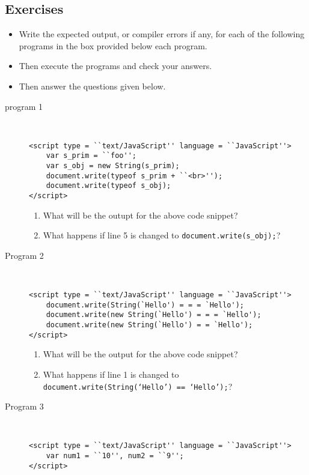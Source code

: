 \documentclass[11pt,a4paper]{article}
\def\AnswerBox{\fbox{\begin{minipage}{4in}\hfill\vspace{0.5in}\end{minipage}}}
\begin{document}
\subsection*{Exercises}
\begin{itemize}
\item Write the expected output, or compiler errors if any, for each of the following programs in the box provided below each program.
\item Then execute the programs and check your answers.
\item Then answer the questions given below.
\end{itemize}
\begin{description}
\item[program 1]\
\begin{lstlisting}
<script type = ``text/JavaScript'' language = ``JavaScript''>
    var s_prim = ``foo'';
    var s_obj = new String(s_prim);  
    document.write(typeof s_prim + ``<br>''); 
    document.write(typeof s_obj);  
</script>
\end{lstlisting}

\AnswerBox

\begin{enumerate}[label=\bfseries Q\arabic*:]\itemsep10pt
\item What will be the outupt for the above code snippet?
\item What happens if line 5 is changed to \texttt{document.write(s\_obj);}?

\end{enumerate}

\item[Program 2]\
\begin{lstlisting}
<script type = ``text/JavaScript'' language = ``JavaScript''>
    document.write(String(`Hello') = = = `Hello');
    document.write(new String(`Hello') = = = `Hello');
    document.write(new String(`Hello') = = `Hello');
</script>
\end{lstlisting}

\AnswerBox

\begin{enumerate}[label=\bfseries Q\arabic*:]\itemsep10pt
\item What will be the output for the above code snippet?
\item What happens if line 1 is changed to \texttt{document.write(String(`Hello') == `Hello');}?
\end{enumerate}
\item [Program 3]\ 
\begin{lstlisting}
<script type = ``text/JavaScript'' language = ``JavaScript''>
    var num1 = ``10'', num2 = ``9'';
</script>
\end{lstlisting}
\AnswerBox


\end{description}
\end{document}
